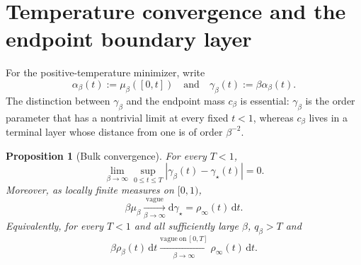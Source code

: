 \documentclass[10pt]{amsart}
\newtheorem{proposition}[proposition]{Proposition}
\theoremstyle{definition}
\theoremstyle{remark}
\numberwithin{equation}{section}
\newcommand{\1}{\mathbf 1}
\newcommand{\dd}{\,\mathrm d}
\begin{document}
\iffalse
\section{Temperature convergence and the endpoint boundary layer}
\label{sec:temperature-convergence}

For the positive-temperature minimizer, write
\begin{equation*}
 \alpha_\beta(t):=\mu_\beta([0,t])
 \quad\text{and}\quad
 \gamma_\beta(t):=\beta\alpha_\beta(t).
\end{equation*}
The distinction between $\gamma_\beta$ and the endpoint mass $c_\beta$ is essential: $\gamma_\beta$ is the order parameter that has a nontrivial limit at every fixed $t<1$, whereas $c_\beta$ lives in a terminal layer whose distance from one is of order $\beta^{-2}$.

\begin{proposition}[Bulk convergence]
\label{prop:bulk-temperature-convergence}
For every $T<1$,
\begin{equation}
 \lim_{\beta\to\infty}
 \sup_{0\leq t\leq T}|\gamma_\beta(t)-\gamma_\star(t)|=0.
 \label{eq:gamma-beta-uniform-local}
\end{equation}
Moreover, as locally finite measures on $[0,1)$,
\begin{equation}
 \beta\mu_\beta\xrightarrow[\beta\to\infty]{\mathrm{vague}}
 \mathrm d\gamma_\star=\rho_\infty(t)\dd t.
 \label{eq:scaled-measure-vague}
\end{equation}
Equivalently, for every $T<1$ and all sufficiently large $\beta$, $q_\beta>T$ and
\begin{equation}
 \beta\rho_\beta(t)\dd t
 \xrightarrow[\beta\to\infty]{\mathrm{vague\ on}\ [0,T]}
 \rho_\infty(t)\dd t.
 \label{eq:scaled-density-vague}
\end{equation}
\end{proposition}
\end{document}
